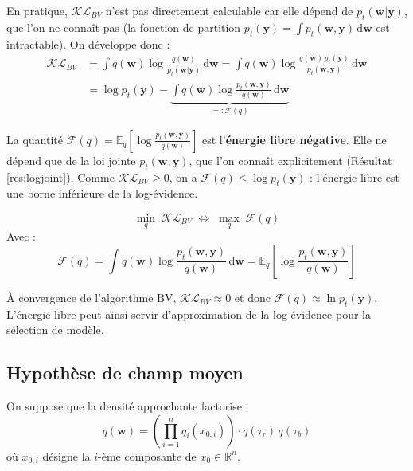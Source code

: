 \documentclass[12pt]{article}
\newcommand{\w}{\boldsymbol{w}}
\newcommand{\y}{\boldsymbol{y}}
\begin{document}
En pratique, $\mathcal{KL}_{BV}$ n'est pas directement calculable car elle dépend de $p_t(\w|\y)$, que l'on ne connaît pas (la fonction de partition $p_t(\y) = \int p_t(\w, \y)\, \mathrm{d}\w$ est intractable). On développe donc :
\begin{align}
    \mathcal{KL}_{BV} &= \int q(\w) \log \frac{q(\w)}{p_t(\w|\y)}\, \mathrm{d}\w = \int q(\w) \log \frac{q(\w)\, p_t(\y)}{p_t(\w, \y)}\, \mathrm{d}\w \nonumber\\[4pt]
    &= \log p_t(\y) - \underbrace{\int q(\w) \log \frac{p_t(\w, \y)}{q(\w)}\, \mathrm{d}\w}_{=: \mathcal{F}(q)}
    \label{eq:kl_decomp}
\end{align}

La quantité $\mathcal{F}(q) = \mathbb{E}_q\!\left[\log \frac{p_t(\w, \y)}{q(\w)}\right]$ est l'\textbf{énergie libre négative}. Elle ne dépend que de la loi jointe $p_t(\w, \y)$, que l'on connaît explicitement (Résultat \ref{res:logjoint}). Comme $\mathcal{KL}_{BV} \geq 0$, on a $\mathcal{F}(q) \leq \log p_t(\y)$ : l'énergie libre est une borne inférieure de la log-évidence.

\begin{resultbox}
\label{res:elbo}
\begin{equation}
    \boxed{\min_q \;\mathcal{KL}_{BV} \;\Longleftrightarrow\; \max_q \;\mathcal{F}(q)}
    \label{eq:elbo_equiv}
\end{equation}
Avec : 
\begin{equation}
\mathcal{F}(q) = \int q(\w) \log \frac{p_t(\w, \y)}{q(\w)}\, \mathrm{d}\w = \mathbb{E}_q\!\left[\log \frac{p_t(\w, \y)}{q(\w)}\right]
\end{equation}
\end{resultbox}

\begin{remarkbox}[Interprétation]
À convergence de l'algorithme BV, $\mathcal{KL}_{BV} \approx 0$ et donc $\mathcal{F}(q) \approx \ln p_t(\y)$. L'énergie libre peut ainsi servir d'approximation de la log-évidence pour la sélection de modèle.
\end{remarkbox}



\subsection{Hypothèse de champ moyen}

\begin{hypothesebox}
\label{hyp:meanfield}
On suppose que la densité approchante factorise 
:
\begin{equation}
    q(\w) = \left(\prod_{i=1}^{n} q_i(x_{0,i})\right) \cdot q(\tau_r)\, q(\tau_b)
    \tag{MF}
    \label{eq:MF}
\end{equation}
où $x_{0,i}$ désigne la $i$-ème composante de $x_0 \in \mathbb{R}^n$.
\end{hypothesebox}
\end{document}
